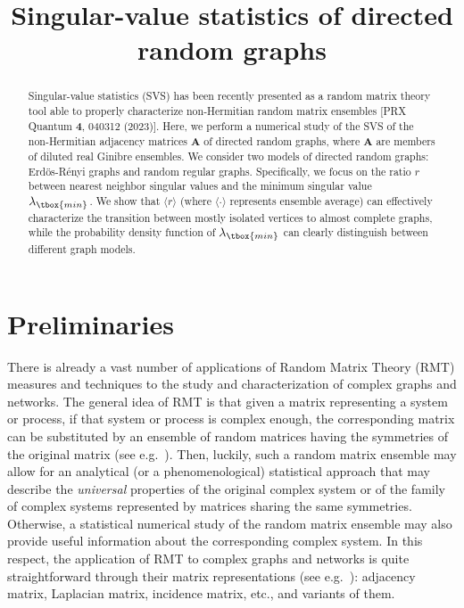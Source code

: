 
\title{Singular-value statistics of directed random graphs}
\begin{abstract}
Singular-value statistics (SVS) has been recently presented as a random matrix theory
tool able to properly characterize non-Hermitian random matrix ensembles [PRX Quantum {\bf 4}, 040312 (2023)].
Here, we perform a numerical study of the SVS of the non-Hermitian adjacency matrices
$\mathbf{A}$ of directed random graphs, where $\mathbf{A}$ are members of diluted real 
Ginibre ensembles. 
We consider two models of directed random graphs: Erd\"os-R\'enyi graphs and random regular graphs.
Specifically, we focus on the ratio $r$ between nearest neighbor singular values 
and the minimum singular value $\lambda_{\tbox{min}}$.
We show that $\langle r \rangle$ (where $\langle \cdot \rangle$ represents ensemble average) 
can effectively characterize the transition between mostly 
isolated vertices to almost complete graphs, while the probability density function of $\lambda_{\tbox{min}}$ 
can clearly distinguish between different graph models.
\end{abstract}
\maketitle


\section{Preliminaries}

There is already a vast number of applications of Random Matrix Theory (RMT) measures and 
techniques to the study and characterization of complex graphs and networks.
The general idea of RMT is that given a matrix representing a system or process, if that system
or process is complex enough, the corresponding matrix can be substituted by an ensemble of
random matrices having the symmetries of the original matrix (see e.g.~\cite{ABF15}).
Then, luckily, such a random matrix ensemble may allow for an analytical (or a phenomenological) 
statistical approach that may describe the {\it universal} properties of the original complex system
or of the family of complex systems represented by matrices sharing the same symmetries.
Otherwise, a statistical numerical study of the random matrix ensemble may also provide useful 
information about the corresponding complex system.
In this respect, the application of RMT to complex graphs and networks is quite straightforward
through their matrix representations (see e.g.~\cite{E11}): adjacency matrix, Laplacian matrix, 
incidence matrix, etc., and variants of them.

